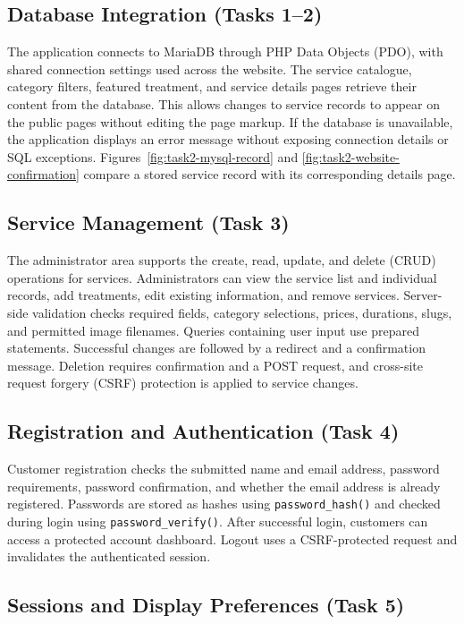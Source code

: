\documentclass[11pt,a4paper]{article}
\newcommand{\code}[1]{{\small\nolinkurl{#1}}}
\begin{document}
\subsection{Database Integration (Tasks 1--2)}

The application connects to MariaDB through PHP Data Objects (PDO), with shared
connection settings used across the website. The service catalogue, category
filters, featured treatment, and service details pages retrieve their content
from the database. This allows changes to service records to appear on the
public pages without editing the page markup. If the database is unavailable,
the application displays an error message without exposing connection details
or SQL exceptions. Figures~\ref{fig:task2-mysql-record} and
\ref{fig:task2-website-confirmation} compare a stored service record with its
corresponding details page.

\subsection{Service Management (Task 3)}

The administrator area supports the create, read, update, and delete (CRUD)
operations for services. Administrators can view the service list and individual
records, add treatments, edit existing information, and remove services.
Server-side validation checks required fields, category selections, prices,
durations, slugs, and permitted image filenames. Queries containing user input
use prepared statements. Successful changes are followed by a redirect and a
confirmation message. Deletion requires confirmation and a POST request, and
cross-site request forgery (CSRF) protection is applied to service changes.

\subsection{Registration and Authentication (Task 4)}

Customer registration checks the submitted name and email address, password
requirements, password confirmation, and whether the email address is already
registered. Passwords are stored as hashes using \code{password_hash()} and
checked during login using \code{password_verify()}. After successful login,
customers can access a protected account dashboard. Logout uses a
CSRF-protected request and invalidates the authenticated session.

\subsection{Sessions and Display Preferences (Task 5)}
\end{document}
